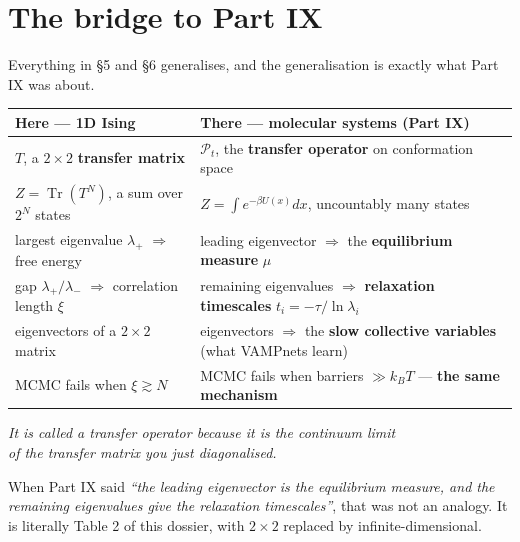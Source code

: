 \clearpage
\renewcommand{\sectioncolor}{indigo}
\section{The bridge to Part IX}

Everything in §5 and §6 generalises, and the generalisation is exactly what Part IX was about.

\begin{center}\small
\begin{tabular}{@{}>{\raggedright\arraybackslash}p{7.6cm}>{\raggedright\arraybackslash}p{8.9cm}@{}}
\toprule
\rowcolor{indigo!12}
\textbf{\color{indigo}Here --- 1D Ising} & \textbf{\color{indigo}There --- molecular systems (Part IX)}\\
\midrule
$T$, a $2\times2$ \textbf{transfer matrix} & $\mathcal{P}_t$, the \textbf{transfer operator} on conformation space\\
$Z=\operatorname{Tr}(T^N)$, a sum over $2^N$ states & $Z=\int e^{-\beta U(x)}dx$, uncountably many states\\
largest eigenvalue $\lambda_+$ $\Rightarrow$ free energy & leading eigenvector $\Rightarrow$ the \textbf{equilibrium measure} $\mu$\\
gap $\lambda_+/\lambda_-$ $\Rightarrow$ correlation length $\xi$ & remaining eigenvalues $\Rightarrow$ \textbf{relaxation timescales} $t_i=-\tau/\ln\lambda_i$\\
eigenvectors of a $2\times2$ matrix & eigenvectors $\Rightarrow$ the \textbf{slow collective variables} (what VAMPnets learn)\\
\rowcolor{alert!7}
MCMC fails when $\xi\gtrsim N$ & MCMC fails when barriers $\gg k_BT$ --- \textbf{the same mechanism}\\
\bottomrule
\end{tabular}
\end{center}

\begin{keyidea}[title={The sentence to keep}]
\begin{center}\itshape\large
It is called a transfer \emph{operator} because it is the continuum limit\\of the transfer
\emph{matrix} you just diagonalised.
\end{center}
\vspace{2pt}
When Part IX said \emph{``the leading eigenvector is the equilibrium measure, and the remaining
eigenvalues give the relaxation timescales''}, that was not an analogy. It is literally Table 2 of
this dossier, with $2\times2$ replaced by infinite-dimensional.
\end{keyidea}

